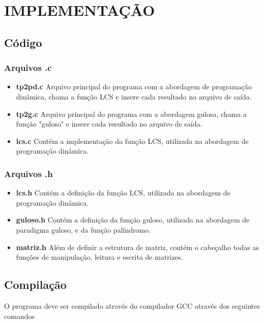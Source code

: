 \documentclass[12pt]{article}
\begin{document}
\section{IMPLEMENTAÇÃO}
\label{implementacao}

\subsection{Código}

\subsubsection{Arquivos .c}

\begin{itemize}
\item \textbf{tp2pd.c} Arquivo principal do programa com a abordagem de programação dinâmica, chama a função LCS e insere cada resultado no arquivo de saída.
\item \textbf{tp2g.c} Arquivo principal do programa com a abordagem gulosa, chama a função "guloso" e insere cada resultado no arquivo de saída.
\item \textbf{lcs.c} Contém a implementação da função LCS, utilizada na abordagem de programação dinâmica.
\end{itemize}

\subsubsection{Arquivos .h}

\begin{itemize}
\item \textbf{lcs.h} Contém a definição da função LCS, utilizada na abordagem de programação dinâmica.
\item \textbf{guloso.h} Contém a definição da função guloso, utilizada na abordagem de paradigma guloso, e da função palíndromo.
\item \textbf{matriz.h} Além de definir a estrutura de matriz, contém o cabeçalho todas as funções de manipulação, leitura e escrita de matrizes.
\end{itemize}

\subsection{Compilação}

O programa deve ser compilado através do compilador GCC através dos seguintes comandos
\end{document}
